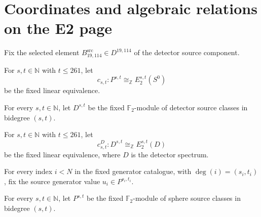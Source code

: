 \section{Coordinates and algebraic relations on the E2 page}

\begin{definition}
\label{frontier:E2Computation:0c823d7609b2}
Fix the selected element $B^{\mathrm{src}}_{19,114}\in D^{19,114}$ of the detector source component.
\end{definition}

\begin{definition}
\label{frontier:E2Computation:1359a65ba983}
For $s,t\in\mathbb N$ with $t\leq261$, let
\[c_{s,t}:P^{s,t}\cong_{\mathbb Z}E_2^{s,t}(S^0)\]
be the fixed linear equivalence.
\end{definition}

\begin{definition}
\label{frontier:E2Computation:1dfdcb9f6b7a}
For every $s,t\in\mathbb N$, let $D^{s,t}$ be the fixed $\mathbb F_2$-module of detector source classes in bidegree $(s,t)$.
\end{definition}

\begin{definition}
\label{frontier:E2Computation:3be7c427b9bf}
For $s,t\in\mathbb N$ with $t\leq261$, let
\[c^D_{s,t}:D^{s,t}\cong_{\mathbb Z}E_2^{s,t}(D)\]
be the fixed linear equivalence, where $D$ is the detector spectrum.
\end{definition}

\begin{definition}
\label{frontier:E2Computation:5978caa8605f}
For every index $i<N$ in the fixed generator catalogue, with $\deg(i)=(s_i,t_i)$, fix the source generator value $u_i\in P^{s_i,t_i}$.
\end{definition}

\begin{definition}
\label{frontier:E2Computation:5e3e82d48166}
For every $s,t\in\mathbb N$, let $P^{s,t}$ be the fixed $\mathbb F_2$-module of sphere source classes in bidegree $(s,t)$.
\end{definition}

